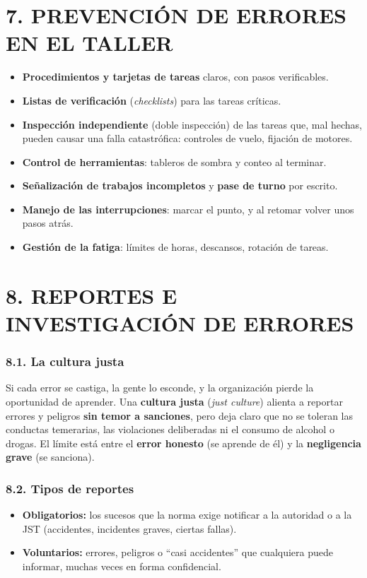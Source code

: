 \section*{7. PREVENCIÓN DE ERRORES EN EL TALLER}
\begin{itemize}
  \item \textbf{Procedimientos y tarjetas de tareas} claros, con pasos verificables.
  \item \textbf{Listas de verificación} (\textit{checklists}) para las tareas críticas.
  \item \textbf{Inspección independiente} (doble inspección) de las tareas que, mal hechas, pueden
        causar una falla catastrófica: controles de vuelo, fijación de motores.
  \item \textbf{Control de herramientas}: tableros de sombra y conteo al terminar.
  \item \textbf{Señalización de trabajos incompletos} y \textbf{pase de turno} por escrito.
  \item \textbf{Manejo de las interrupciones}: marcar el punto, y al retomar volver unos pasos atrás.
  \item \textbf{Gestión de la fatiga}: límites de horas, descansos, rotación de tareas.
\end{itemize}

\section*{8. REPORTES E INVESTIGACIÓN DE ERRORES}

\subsubsection*{8.1. La cultura justa}
Si cada error se castiga, la gente lo esconde, y la organización pierde la oportunidad de
aprender. Una \textbf{cultura justa} (\textit{just culture}) alienta a reportar errores y
peligros \textbf{sin temor a sanciones}, pero deja claro que no se toleran las conductas
temerarias, las violaciones deliberadas ni el consumo de alcohol o drogas. El límite está entre
el \textbf{error honesto} (se aprende de él) y la \textbf{negligencia grave} (se sanciona).

\subsubsection*{8.2. Tipos de reportes}
\begin{itemize}
  \item \textbf{Obligatorios:} los sucesos que la norma exige notificar a la autoridad o a la JST
        (accidentes, incidentes graves, ciertas fallas).
  \item \textbf{Voluntarios:} errores, peligros o ``casi accidentes'' que cualquiera puede informar,
        muchas veces en forma confidencial.
\end{itemize}

